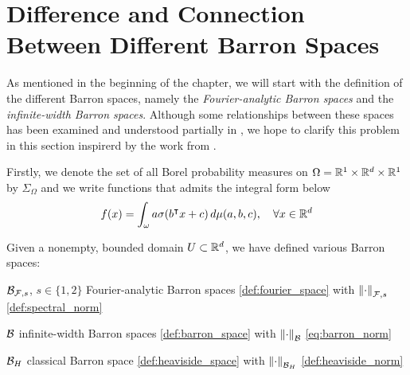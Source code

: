 



\section{Difference and Connection Between Different Barron Spaces}
\label{sec:diff_barron_spaces}

\TODO

As mentioned in the beginning of the chapter, we will start with the definition
of the different Barron spaces, namely the \textit{Fourier-analytic Barron
spaces} and the \textit{infinite-width Barron spaces}. Although some
relationships between these spaces has been examined and understood partially in
\cite{eBarronSpaceFlowinduced2021,eMathematicalUnderstandingNeural2020}, we hope
to clarify this problem in this section inspirerd by the work from
\cite{carageaNeuralNetworkApproximation2022}.

Firstly, we denote the set of all Borel probability measures on $\Omega = \mathbb{R}^1
\times \mathbb{R}^d \times \mathbb{R}^1$ by $\Sigma_{\Omega}$ and we write functions that admits
the integral form below
\begin{equation}
    \label{eq:integral_represent}
    f(x) = \int_{\omega} a\sigma(b{}^{\intercal} x + c) \,d\mu(a,b,c), \quad
    \forall x \in \mathbb{R}^d
\end{equation}

Given a nonempty, bounded domain $U \subset \mathbb{R}^d$, we have defined various
Barron spaces:

\begin{itemize}
    \item $\mathcal{B}_{\mathcal{F}, s}$, $s \in \{1,2\}$ Fourier-analytic Barron spaces 
        \eqref{def:fourier_space} with $\left\| \cdot \right\|_{\mathcal{F},s}$ 
        \eqref{def:spectral_norm}
    \item $\mathcal{B}$ infinite-width Barron spaces \eqref{def:barron_space} with
        $\left\| \cdot \right\|_{\mathcal{B}}$ \eqref{eq:barron_norm}
    {
        \setlength\itemindent{25pt}
        \item $\mathcal{B}_{H}$ classical Barron space \eqref{def:heaviside_space}
            with $\left\| \cdot \right\|_{\mathcal{B}_H}$ \eqref{def:heaviside_norm}
    }
\end{itemize}

